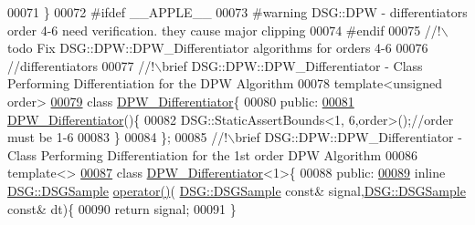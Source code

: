 \begin{DoxyCode}
00071         \}
00072 \textcolor{preprocessor}{#ifdef \_\_APPLE\_\_}
00073 \textcolor{preprocessor}{#warning DSG::DPW - differentiators order 4-6 need verification. they cause major clipping}
00074 \textcolor{preprocessor}{#endif}
00075 \textcolor{comment}{        //!\(\backslash\)todo Fix DSG::DPW::DPW\_Differentiator algorithms for orders 4-6}
00076 \textcolor{comment}{}        \textcolor{comment}{//differentiators}\textcolor{comment}{}
00077 \textcolor{comment}{        //!\(\backslash\)brief DSG::DPW::DPW\_Differentiator - Class Performing Differentiation for the DPW Algorithm}
00078 \textcolor{comment}{}        \textcolor{keyword}{template}<\textcolor{keywordtype}{unsigned} order>
\hypertarget{_d_p_w_8h_source_l00079}{}\hyperlink{class_d_s_g_1_1_d_p_w_1_1_d_p_w___differentiator}{00079}         \textcolor{keyword}{class }\hyperlink{class_d_s_g_1_1_d_p_w_1_1_d_p_w___differentiator}{DPW\_Differentiator}\{
00080         \textcolor{keyword}{public}:
\hypertarget{_d_p_w_8h_source_l00081}{}\hyperlink{class_d_s_g_1_1_d_p_w_1_1_d_p_w___differentiator_acff6769e1c7555fea5e74f1e15bdecd9}{00081}             \hyperlink{class_d_s_g_1_1_d_p_w_1_1_d_p_w___differentiator_acff6769e1c7555fea5e74f1e15bdecd9}{DPW\_Differentiator}()\{
00082                 DSG::StaticAssertBounds<1, 6,order>();\textcolor{comment}{//order must be 1-6}
00083             \}
00084         \};\textcolor{comment}{}
00085 \textcolor{comment}{        //!\(\backslash\)brief DSG::DPW::DPW\_Differentiator - Class Performing Differentiation for the 1st order DPW
       Algorithm}
00086 \textcolor{comment}{}        \textcolor{keyword}{template}<>
\hypertarget{_d_p_w_8h_source_l00087}{}\hyperlink{class_d_s_g_1_1_d_p_w_1_1_d_p_w___differentiator_3_011_01_4}{00087}         \textcolor{keyword}{class }\hyperlink{class_d_s_g_1_1_d_p_w_1_1_d_p_w___differentiator}{DPW\_Differentiator}<1>\{
00088         \textcolor{keyword}{public}:
\hypertarget{_d_p_w_8h_source_l00089}{}\hyperlink{class_d_s_g_1_1_d_p_w_1_1_d_p_w___differentiator_3_011_01_4_a17a8d0b7f400a776fafaa5639b8a0ef2}{00089}             \textcolor{keyword}{inline} \hyperlink{namespace_d_s_g_ac39a94cd27ebcd9c1e7502d0c624894a}{DSG::DSGSample} \hyperlink{class_d_s_g_1_1_d_p_w_1_1_d_p_w___differentiator_3_011_01_4_a17a8d0b7f400a776fafaa5639b8a0ef2}{operator()}(
      \hyperlink{namespace_d_s_g_ac39a94cd27ebcd9c1e7502d0c624894a}{DSG::DSGSample} \textcolor{keyword}{const}& signal,\hyperlink{namespace_d_s_g_ac39a94cd27ebcd9c1e7502d0c624894a}{DSG::DSGSample} \textcolor{keyword}{const}& dt)\{
00090                 \textcolor{keywordflow}{return} signal;
00091             \}

\end{DoxyCode}
